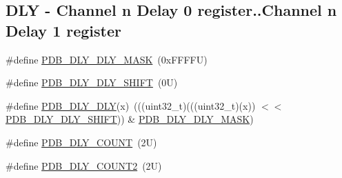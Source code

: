\subsection*{D\+LY -\/ Channel n Delay 0 register..Channel n Delay 1 register}
\begin{DoxyCompactItemize}
\item 
\#define \mbox{\hyperlink{group___p_d_b___register___masks_ga79150887ba3f74efde99b40d3b9c5e44}{P\+D\+B\+\_\+\+D\+L\+Y\+\_\+\+D\+L\+Y\+\_\+\+M\+A\+SK}}~(0x\+F\+F\+F\+F\+U)
\item 
\#define \mbox{\hyperlink{group___p_d_b___register___masks_ga431302f6c6fd1396cbb05844f864d241}{P\+D\+B\+\_\+\+D\+L\+Y\+\_\+\+D\+L\+Y\+\_\+\+S\+H\+I\+FT}}~(0\+U)
\item 
\#define \mbox{\hyperlink{group___p_d_b___register___masks_ga39781873dd40fb95e69b65d323ab49bf}{P\+D\+B\+\_\+\+D\+L\+Y\+\_\+\+D\+LY}}(x)~(((uint32\+\_\+t)(((uint32\+\_\+t)(x)) $<$$<$ \mbox{\hyperlink{group___p_d_b___register___masks_ga431302f6c6fd1396cbb05844f864d241}{P\+D\+B\+\_\+\+D\+L\+Y\+\_\+\+D\+L\+Y\+\_\+\+S\+H\+I\+FT}})) \& \mbox{\hyperlink{group___p_d_b___register___masks_ga79150887ba3f74efde99b40d3b9c5e44}{P\+D\+B\+\_\+\+D\+L\+Y\+\_\+\+D\+L\+Y\+\_\+\+M\+A\+SK}})
\item 
\#define \mbox{\hyperlink{group___p_d_b___register___masks_ga92fcafb0da11b7d2a8a5740281ffbdcb}{P\+D\+B\+\_\+\+D\+L\+Y\+\_\+\+C\+O\+U\+NT}}~(2\+U)
\item 
\#define \mbox{\hyperlink{group___p_d_b___register___masks_ga7ecc8a9c95218a85e076d1e9330da0ec}{P\+D\+B\+\_\+\+D\+L\+Y\+\_\+\+C\+O\+U\+N\+T2}}~(2\+U)
\end{DoxyCompactItemize}
